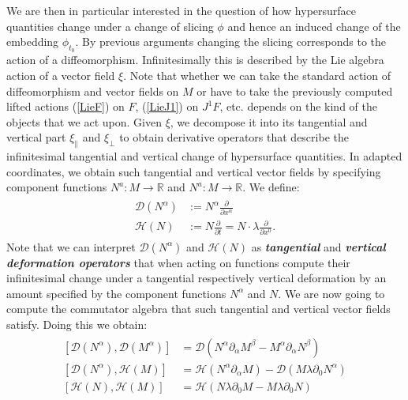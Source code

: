 We are then in particular interested in the question of how hypersurface quantities change under a change of slicing $\phi$ and hence an induced change of the embedding $\phi_{t_0}$. By previous arguments changing the slicing corresponds to the action of a diffeomorphism. Infinitesimally this is described by the Lie algebra action of a vector field $\xi$. Note that whether we can take the standard action of diffeomorphism and vector fields on $M$ or have to take the previously computed lifted actions (\ref{LieF}) on $F$, (\ref{LieJ1}) on $J^1F$, etc. depends on the kind of the objects that we act upon.  Given $\xi$, we decompose it into its tangential and vertical part $\xi_{\parallel}$ and $\xi_{\perp}$ to obtain derivative operators that describe the infinitesimal tangential and vertical change of hypersurface quantities.  In adapted coordinates, we obtain such tangential and vertical vector fields by specifying component functions
 $N^a : M \rightarrow \mathbb{R}$ and $N^a : M \rightarrow \mathbb{R}$. We define: 
\begin{align}
    \begin{aligned}
    \mathcal{D}(N^{\alpha}) &:= N^{\alpha} \frac{\partial}{\partial x^{\alpha}} \\
    \mathcal{H}(N) &:= N \frac{\partial}{\partial t} = N \cdot \lambda \frac{\partial}{\partial x^0}.
    \end{aligned}
\end{align} 
Note that we can interpret $\mathcal{D}(N^\alpha)$ and $\mathcal{H}(N)$ as \textit{\textbf{tangential}} and \textit{\textbf{vertical deformation operators}} that when acting on functions compute their infinitesimal change under a tangential respectively vertical deformation by an amount specified by the component functions $N^{\alpha}$ and $N$.
We are now going to compute the commutator algebra that such tangential and vertical vector fields satisfy. Doing this we obtain:
\begin{align}
    \begin{aligned}
    \left [ \mathcal{D}(N^{\alpha}), \mathcal{D}(M^{\alpha}) \right] &= \mathcal{D}(N^\alpha \partial_{\alpha}M^{\beta} - M^{\alpha} \partial_{\alpha} N^{\beta}) \\
    \left[ \mathcal{D}(N^{\alpha}), \mathcal{H}(M) \right] &= \mathcal{H}(N^{\alpha} \partial_{\alpha} M) - \mathcal{D}(M \lambda \partial_0 N^{\alpha})\\
    \left[ \mathcal{H}(N), \mathcal{H}(M) \right ] &= \mathcal{H}(N \lambda \partial_0 M - M \lambda \partial_0N)
    \end{aligned}
\end{align}
